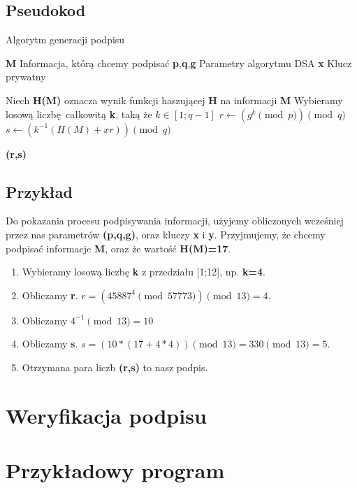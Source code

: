 \documentclass[11pt]{article}
\begin{document}
\subsection{Pseudokod}
\begin{algorithm}
\caption{Algorytm generacji podpisu}\label{alg:cap}
  \begin{algorithmic}[1]
    \Require \textbf{M}
    \Comment Informacja, którą chcemy podpisać
    \Require \textbf{p},\textbf{q},\textbf{g}
    \Comment Parametry algorytmu DSA
    \Require \textbf{x}
    \Comment Klucz prywatny

    \State Niech \textbf{H(M)} oznacza wynik funkcji haszującej \textbf{H} na
      informacji \textbf{M}
    \Repeat
      \State Wybieramy losową liczbę całkowitą \textbf{k}, taką że $k \in [1;q-1]$
      \State $r \gets (g^{k} \pmod p) \pmod q$
      \State $s \gets (k^{-1}(H(M) + xr)) \pmod q$

    \State \Return \textbf{(r,s)}
  \end{algorithmic}
\end{algorithm}

\subsection{Przykład}
Do pokazania procesu podpisywania informacji, użyjemy obliczonych wcześniej
przez nas parametrów \textbf{(p,q,g)}, oraz kluczy \textbf{x} i \textbf{y}.
Przyjmujemy, że chcemy podpisać informacje \textbf{M}, oraz że wartość
\textbf{H(M)=17}.

\begin{enumerate}
  \item Wybieramy losową liczbę \textbf{k} z przedziału [1;12], np. \textbf{k=4}.
  \item Obliczamy \textbf{r}. $r=(45887^{4} \pmod 57773) \pmod 13 = 4$.
  \item Obliczamy $4^{-1} \pmod 13 = 10$
  \item Obliczamy \textbf{s}. $s= (10 * (17 + 4 * 4)) \pmod 13 = 330 \pmod 13 = 5$.
  \item Otrzymana para liczb \textbf{(r,s)} to nasz podpis.
\end{enumerate}

\section{Weryfikacja podpisu}

\section{Przykładowy program}
\end{document}
